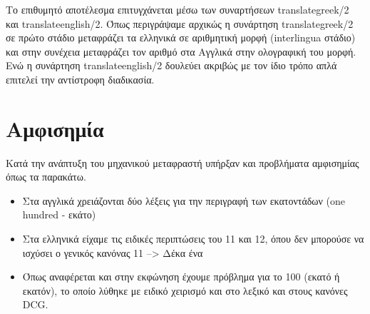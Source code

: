 \documentclass[a4paper,12pt]{article}
\begin{document}
	Το επιθυμητό αποτέλεσμα επιτυγχάνεται μέσω των συναρτήσεων translategreek/2 και translateenglish/2. Όπως περιγράψαμε αρχικώς η συνάρτηση translategreek/2 σε πρώτο στάδιο μεταφράζει τα ελληνικά σε αριθμητική μορφή (interlingua στάδιο) και στην συνέχεια μεταφράζει τον αριθμό στα Αγγλικά στην ολογραφική του μορφή. Ενώ η συνάρτηση translateenglish/2 δουλεύει ακριβώς με τον ίδιο τρόπο απλά επιτελεί την αντίστροφη διαδικασία.
\section{Αμφισημία}
Κατά την ανάπτυξη του μηχανικού μεταφραστή υπήρξαν και προβλήματα αμφισημίας όπως τα παρακάτω.
\begin{itemize}
  \item Στα αγγλικά χρειάζονται δύο λέξεις για την περιγραφή των εκατοντάδων (one hundred - εκάτο)
  \item Στα ελληνικά είχαμε τις ειδικές περιπτώσεις του 11 και 12, όπου δεν μπορούσε να ισχύσει ο γενικός κανόνας 11 --> Δέκα ένα 
  \item Όπως αναφέρεται και στην εκφώνηση έχουμε πρόβλημα για το 100 (εκατό ή εκατόν), το οποίο λύθηκε με ειδικό χειρισμό και στο λεξικό και στους κανόνες DCG.
\end{itemize}
\end{document}

